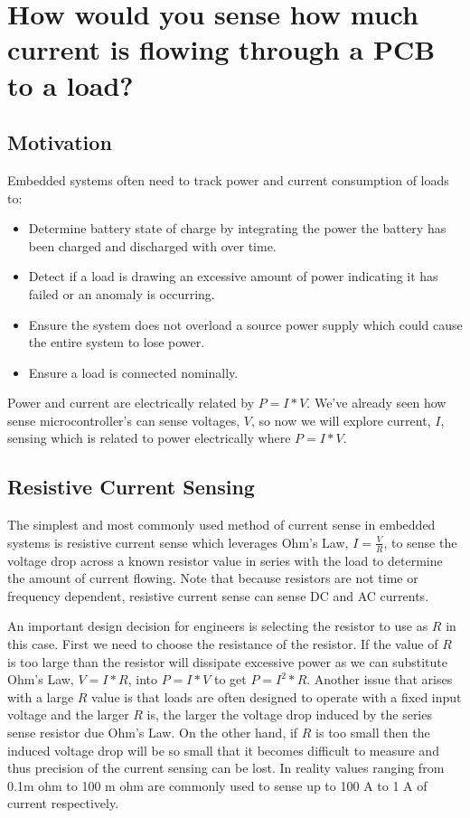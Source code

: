 \documentclass[main.tex]{subfiles}
\begin{document}
\section{How would you sense how much current is flowing through a PCB to a load?}

\subsection{Motivation}
Embedded systems often need to track power and current consumption of loads to:
\begin{itemize}
    \item Determine battery state of charge by integrating the power the battery has been charged and discharged with over time.
    \item Detect if a load is drawing an excessive amount of power indicating it has failed or an anomaly is occurring. 
    \item Ensure the system does not overload a source power supply which could cause the entire system to lose power. 
    \item Ensure a load is connected nominally.
\end{itemize}
Power and current are electrically related by $P = I * V$. We've already seen how sense microcontroller's can sense voltages, $V$, so now we will explore current, $I$, sensing which is related to power electrically where $P = I * V$.

\subsection{Resistive Current Sensing}
The simplest and most commonly used method of current sense in embedded systems is resistive current sense which leverages Ohm's Law, $I = \frac{V}{R}$, to sense the voltage drop across a known resistor value in series with the load to determine the amount of current flowing. Note that because resistors are not time or frequency dependent, resistive current sense can sense DC and AC currents. 

An important design decision for engineers is selecting the resistor to use as $R$ in this case. First we need to choose the resistance of the resistor. If the value of $R$ is too large than the resistor will dissipate excessive power as we can substitute Ohm's Law, $V=I*R$, into $P=I*V$ to get $P=I^{2}*R$. Another issue that arises with a large $R$ value is that loads are often designed to operate with a fixed input voltage and the larger $R$ is, the larger the voltage drop induced by the series sense resistor due Ohm's Law. On the other hand, if $R$ is too small then the induced voltage drop will be so small that it becomes difficult to measure and thus precision of the current sensing can be lost. In reality values ranging from 0.1m ohm to 100 m ohm are commonly used to sense up to 100 A to 1 A of current respectively.
\end{document}
